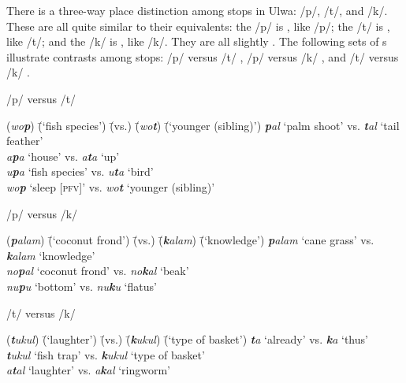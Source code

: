 
There is a three-way place distinction among  stops in Ulwa:  /p/,  /t/, and  /k/. These are all quite similar to their  equivalents: the /p/ is , like  /p/; the /t/ is , like  /t/; and the /k/ is , like  /k/. They are all slightly . The following sets of s illustrate contrasts among  stops: /p/ versus /t/ , /p/ versus /k/ , and /t/ versus /k/ .

\ea%
    \label{ex:phon:1}
            /p/ versus /t/\\
\begin{tabbing}
{(\textit{wo\textbf{p}})} \= {(‘fish species’)} \= {(vs.)} \= {(\textit{wo\textbf{t}})} \= {(‘younger (sibling)’)}\kill
{\textit{\textbf{p}al}} \> {‘palm shoot’} \> {vs.} \> {\textit{\textbf{t}al}} \> {‘tail feather’}\\
{\textit{a\textbf{p}a}} \> {‘house’} \> {vs.} \> {\textit{a\textbf{t}a}} \> {‘up’}\\
{\textit{u\textbf{p}a}} \> {‘fish species’} \> {vs.} \> {\textit{u\textbf{t}a}} \> {‘bird’}\\
{\textit{wo\textbf{p}}} \> {‘sleep [\textsc{pfv]}’} \> {vs.} \> {\textit{wo\textbf{t}}} \> {‘younger (sibling)’}
\end{tabbing}
\z

\ea%
    \label{ex:phon:2}
            /p/ versus /k/\\
\begin{tabbing}
{(\textit{\textbf{p}alam})} \= {(‘coconut frond’)} \= {(vs.)} \= {(\textit{\textbf{k}alam})} \= {(‘knowledge’)}\kill
{\textit{\textbf{p}alam}} \> {‘cane grass’} \> {vs.} \> {\textit{\textbf{k}alam}} \> {‘knowledge’}\\
{\textit{no\textbf{p}al}} \> {‘coconut frond’} \> {vs.} \> {\textit{no\textbf{k}al}} \> {‘beak’}\\
{\textit{nu\textbf{p}u}} \> {‘bottom’} \> {vs.} \> {\textit{nu\textbf{k}u}} \> {‘flatus’}
\end{tabbing}
\z
            
\ea%
    \label{ex:phon:3}
            /t/ versus /k/\\
\begin{tabbing}
{(\textit{\textbf{t}ukul})} \= {(‘laughter’)} \= {(vs.)} \= {(\textit{\textbf{k}ukul})} \= {(‘type of basket’)}\kill
{\textit{\textbf{t}a}} \> {‘already’} \> {vs.} \> {\textit{\textbf{k}a}} \> {‘thus’}\\
{\textit{\textbf{t}ukul}} \> {‘fish trap’} \> {vs.} \> {\textit{\textbf{k}ukul}} \> {‘type of basket’}\\
{\textit{a\textbf{t}al}} \> {‘laughter’} \> {vs.} \> {\textit{a\textbf{k}al}} \> {‘ringworm’}
\end{tabbing}
\z

